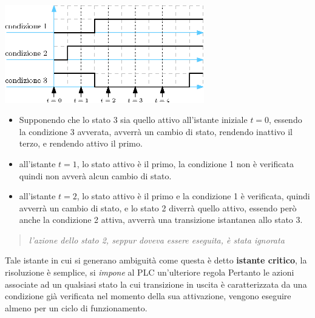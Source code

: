 \documentclass[10pt, letterpaper]{report}
\begin{document}
\begin{center}
    \includegraphics[width=0.65\textwidth ]{images/condizioni.eps}
\end{center}\begin{itemize}
    \item 
    Supponendo che lo stato 3 sia quello attivo all'istante iniziale $t=0$, essendo la condizione 3 avverata, avverrà un cambio di stato, rendendo inattivo il terzo, e rendendo attivo il primo.
    \item all'istante $t=1$, lo stato attivo è il primo, la condizione 1 non è verificata quindi non avverà alcun cambio di stato.
    \item all'istante $t=2$, lo stato attivo è il primo e la condizione 1 è verificata, quindi avverrà un cambio di stato, e lo stato 2 diverrà quello attivo, essendo però anche la condizione 2 attiva, avverrà una transizione istantanea allo stato 3. 
\end{itemize}
\begin{quotation}
    \textit{l'azione dello stato 2, seppur doveva essere eseguita, è stata ignorata}
\end{quotation}
Tale istante in cui si generano ambiguità come questa è detto \textbf{istante critico}, la risoluzione è semplice, si \textit{impone} al PLC un'ulteriore regola 
Pertanto le azioni associate ad un qualsiasi stato la cui transizione in uscita è
caratterizzata da una condizione già verificata nel momento della sua attivazione,
vengono eseguire almeno per un ciclo di funzionamento. 
\end{document}
